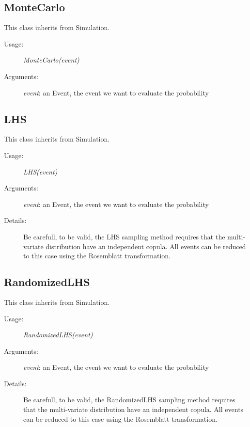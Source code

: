 \newpage
\subsection{MonteCarlo}

This class inherits from Simulation.

\begin{description}
\item[Usage:] \textit{MonteCarlo(event)}

\item[Arguments:]  \textit{event}: an Event, the event we want to evaluate the probability

\end{description}
\newpage
\subsection{LHS}

This class inherits from Simulation.
\begin{description}
\item[Usage:] \textit{LHS(event)}

\item[Arguments:] \textit{event}: an Event, the event we want to evaluate the probability
\item[Details:] Be carefull, to be valid, the LHS sampling method requires that the multi-variate distribution have an independent copula. All events can be reduced to this case using the Rosemblatt transformation.
\end{description}

\newpage
\subsection{RandomizedLHS}

This class inherits from Simulation.
\begin{description}
\item[Usage:] \textit{RandomizedLHS(event)}

\item[Arguments:] \textit{event}: an Event, the event we want to evaluate the probability
\item[Details:] Be carefull, to be valid, the RandomizedLHS sampling method requires that the multi-variate distribution have an independent copula. All events can be reduced to this case using the Rosemblatt transformation.
\end{description}

